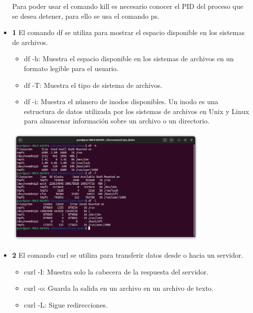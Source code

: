 \begin{itemize}
\begin{center}
    \end{center}
    Para poder usar el comando kill es necesario conocer el PID del proceso que se desea detener, para ello se usa el comando ps.\\
    \item \textbf{1}
    El comando df se utiliza para mostrar el espacio disponible en los sistemas de archivos.\\
    \begin{itemize}
        \item df -h: Muestra el espacio disponible en los sistemas de archivos en un formato legible para el usuario.\\
        \item df -T: Muestra el tipo de sistema de archivos.\\
        \item df -i: Muestra el número de inodos disponibles. Un inodo es una estructura de datos utilizada por los sistemas de archivos 
        en Unix y Linux para almacenar información sobre un archivo o un directorio. \\
    \end{itemize}
    \begin{center}
        \includegraphics[width=10cm]{IMAGE/comandos/df.png}\\
    \end{center}
    \item \textbf{2}
    El comando curl se utiliza para transferir datos desde o hacia un servidor.\\
    \begin{itemize}
        \item curl -I: Muestra solo la cabecera de la respuesta del servidor.\\
        \item curl -o: Guarda la salida en un archivo en un archivo de texto.\\
        \item curl -L: Sigue redirecciones.\\ 

\end{itemize}
\end{itemize}
